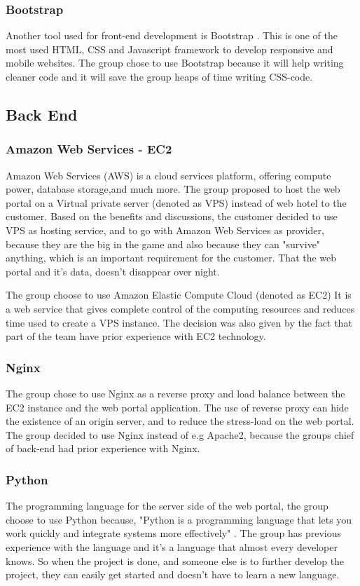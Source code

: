 \subsubsection{Bootstrap}
Another tool used for front-end development is Bootstrap \cite{Bootstrap}. This is one of the most used HTML, CSS and Javascript framework to develop responsive and mobile websites. The group chose to use Bootstrap because it will help writing cleaner code and it will save the group heaps of time writing CSS-code. 


\subsection{Back End}
\subsubsection{Amazon Web Services - EC2}
Amazon Web Services (AWS) is a cloud services platform, offering compute power, database storage,and much more. \cite{AWS} The group proposed to host the web portal on a Virtual private server (denoted as VPS)  instead of web hotel to the customer. Based on the benefits and discussions, the customer decided to use VPS as hosting service, and to go with Amazon Web Services as provider, because they are the big in the game and also because they can "survive" anything, which is an important requirement for the customer. That the web portal and it's data, doesn't disappear over night. 

The group choose to use Amazon Elastic Compute Cloud (denoted as EC2) \cite{EC2} It is a web service that gives complete control of the computing resources and reduces time used to create a VPS instance. The decision was also given by the fact that part of the team have prior experience with EC2 technology. 


\subsubsection{Nginx}
The group chose to use Nginx \cite{nginx} as a reverse proxy and load balance between the EC2 instance and the web portal application. The use of reverse proxy can hide the existence of an origin server, and to reduce the stress-load on the web portal. The group decided to use Nginx instead of e.g Apache2, because the groups chief of back-end had prior experience with Nginx.


\subsubsection{Python}
The programming language for the server side of the web portal, the group choose to use Python because, "Python is a programming language that lets you work quickly and integrate systems more effectively" \cite{python}. The group has previous experience with the language and it's a language that almost every developer knows. So when the project is done, and someone else is to further develop the project, they can easily get started and doesn't have to learn a new language.

